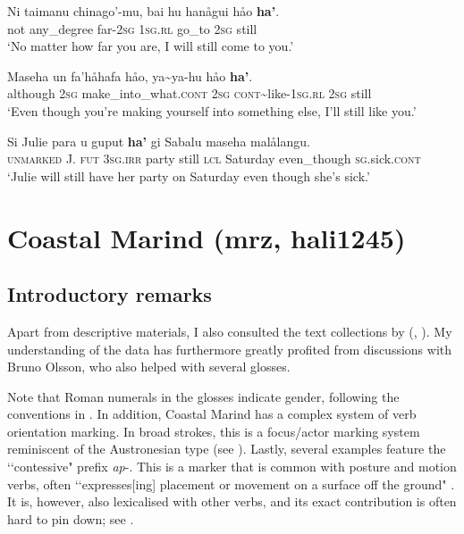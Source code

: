 \begin{exe}
	\ex
	\gll Ni taimanu chinago’-mu, {bai hu} hanågui håo \textbf{ha’}.\\
	not any\_degree far-2\textsc{sg} {1\textsc{sg}.\textsc{rl}} go\_to 2\textsc{sg} still\\
	\glt \lq No matter how far you are, I will still come to you.\rq{ }\parencite[204]{Chung2020}

	\ex
	\gll Maseha un fa’håhafa håo, ya\sim{}ya-hu håo \textbf{ha'}.\\
	although 2\textsc{sg} make\_into\_what.\textsc{cont} 2\textsc{sg} \textsc{cont}\sim{}like-1\textsc{sg}.\textsc{rl} 2\textsc{sg} still\\
	\glt \lq Even though you're making yourself into something else, I'll still like you.' \parencite[335]{Chung2020}

	\ex
	\gll Si Julie para u guput \textbf{ha'} gi Sabalu maseha malålangu.\\
	\textsc{unmarked} J. \textsc{fut} 3\textsc{sg}.\textsc{irr} party still \textsc{lcl} Saturday even\_though \textsc{sg}.sick.\textsc{cont}\\
	\glt \lq Julie will still have her party on Saturday even though she’s sick.’ \parencite[398]{Chung2020}
\end{exe}

\section{Coastal Marind (mrz, hali1245)}
\label{appendixCoastalMarind}

\subsection{Introductory remarks}
Apart from descriptive materials, I also consulted the text collections by \citeauthor{Olsson2021a} (\citeyear*{Olsson2021a}, \citeyear*{Olsson2021b}). My understanding of the data has furthermore greatly profited from discussions with Bruno Olsson, who also helped with several glosses.

Note that Roman numerals in the glosses indicate gender, following the conventions in \textcite{Olsson2017}. In addition, Coastal Marind has a complex system of verb orientation marking. In broad strokes, this is a focus/actor marking system reminiscent of the Austronesian type (see \cite[ch. 10]{Olsson2017}). Lastly, several examples feature the \lq\lq contessive" prefix \textit{ap}-. This is a marker that is common with posture and motion verbs, often \lq\lq expresses[ing] placement or movement on a surface off the ground" \parencite[480]{Olsson2017}. It is, however, also lexicalised with other verbs, and its exact contribution is often hard to pin down; see \textcite[480–485]{Olsson2017}.

